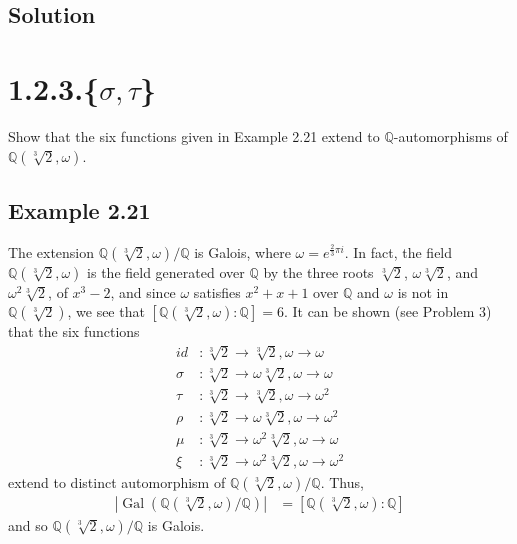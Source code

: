 \documentclass[fleqn]{article}
\DeclareMathOperator{\Gal}{Gal}
\begin{document}
        \subsection{Solution}
        
    
    \section{1.2.3.\{$\sigma, \tau$\}}
    Show that the six functions given in Example 2.21 extend to $\mathbb{Q}$-automorphisms of $\mathbb{Q}\left(\sqrt[3]{2}, \omega\right)$.
        
        \subsection{Example 2.21}
        The extension $\mathbb{Q}\left(\sqrt[3]{2}, \omega\right)/\mathbb{Q}$ is Galois, where $\omega = e^{\frac{2}{3} \pi i}$.  In fact, the field $\mathbb{Q}\left(\sqrt[3]{2}, \omega\right)$ is the field generated over $\mathbb{Q}$ by the three roots $\sqrt[3]{2}$, $\omega \sqrt[3]{2}$, and $\omega^2 \sqrt[3]{2}$, of $x^3 - 2$, and since $\omega$ satisfies $x^2 + x + 1$ over $\mathbb{Q}$ and $\omega$ is not in $\mathbb{Q}\left(\sqrt[3]{2}\right)$, we see that $\left[\mathbb{Q}\left(\sqrt[3]{2}, \omega\right) : \mathbb{Q}\right] = 6$.  It can be shown (see Problem 3) that the six functions
        \begin{align}
            id &: \sqrt[3]{2} \to \sqrt[3]{2}, \omega \to \omega \\
            \sigma &: \sqrt[3]{2} \to \omega \sqrt[3]{2}, \omega \to \omega \\
            \tau &: \sqrt[3]{2} \to \sqrt[3]{2}, \omega \to \omega^2 \\
            \rho &: \sqrt[3]{2} \to \omega \sqrt[3]{2}, \omega \to \omega^2 \\
            \mu &: \sqrt[3]{2} \to \omega^2 \sqrt[3]{2}, \omega \to \omega \\
            \xi &: \sqrt[3]{2} \to \omega^2 \sqrt[3]{2}, \omega \to \omega^2
        \end{align}
        extend to distinct automorphism of $\mathbb{Q}\left(\sqrt[3]{2}, \omega\right)/\mathbb{Q}$.  Thus, 
        \begin{align}
            \left|\Gal\left(\mathbb{Q}\left(\sqrt[3]{2}, \omega\right)/\mathbb{Q}\right)\right| &= \left[\mathbb{Q}\left(\sqrt[3]{2}, \omega\right) : \mathbb{Q}\right]
        \end{align}
        and so $\mathbb{Q}\left(\sqrt[3]{2}, \omega\right)/\mathbb{Q}$ is Galois.
        
\end{document}
